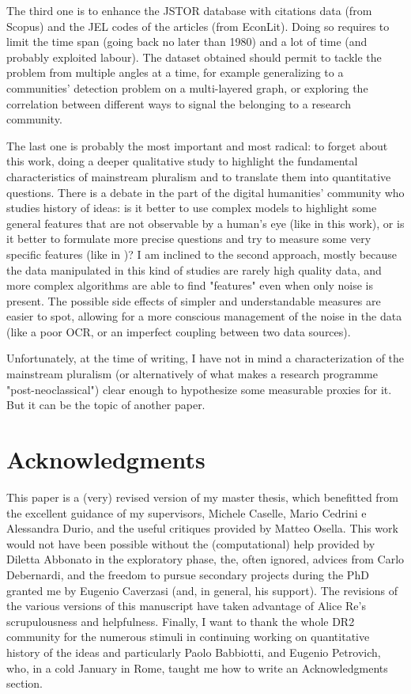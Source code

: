 \documentclass[a4paper, 11pt, headings=standardclasses, tablecaptionsbelow]{scrartcl}
\begin{document}
The third one is to enhance the JSTOR database with citations data (from Scopus) and the JEL codes of the articles (from EconLit). Doing so requires to limit the time span (going back no later than 1980) and a lot of time (and probably exploited labour).
The dataset obtained should permit to tackle the problem from multiple angles at a time, for example generalizing to a communities' detection problem on a multi-layered graph, or exploring the correlation between different ways to signal the belonging to a research community.

The last one is probably the most important and most radical: to forget about this work, doing a deeper qualitative study to highlight the fundamental characteristics of mainstream pluralism and to translate them into quantitative questions.
There is a debate in the part of the digital humanities' community who studies history of ideas: is it better to use complex models to highlight some general features that are not observable by a human's eye (like in this work), or is it better to formulate more precise questions and try to measure some very specific features (like in \textcite{babbiotti2022})?
I am inclined to the second approach, mostly because the data manipulated in this kind of studies are rarely high quality data, and more complex algorithms are able to find "features" even when only noise is present. The possible side effects of simpler and understandable measures are easier to spot, allowing for a more conscious management of the noise in the data (like a poor OCR, or an imperfect coupling between two data sources).

Unfortunately, at the time of writing, I have not in mind a characterization of the mainstream pluralism (or alternatively of what makes a research programme "post-neoclassical"\parencite{Redigonda2023}) clear enough to hypothesize some measurable proxies for it. But it can be the topic of another paper.

\section*{Acknowledgments}
This paper is a (very) revised version of my master thesis, which benefitted from the excellent guidance of my supervisors, Michele Caselle, Mario Cedrini e Alessandra Durio, and the useful critiques provided by Matteo Osella.
This work would not have been possible without the (computational) help provided by Diletta Abbonato in the exploratory phase, the, often ignored, advices from Carlo Debernardi, and the freedom to pursue secondary projects during the PhD granted me by Eugenio Caverzasi (and, in general, his support).
The revisions of the various versions of this manuscript have taken advantage of Alice Re's scrupulousness and helpfulness.
Finally, I want to thank the whole DR2 community for the numerous stimuli in continuing working on quantitative history of the ideas and particularly Paolo Babbiotti, and Eugenio Petrovich, who, in a cold January in Rome, taught me how to write an Acknowledgments section.
\end{document}
